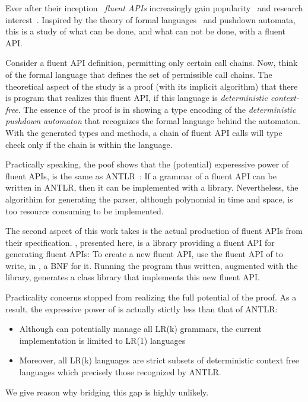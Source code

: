 Ever after their inception~\cite{Fowler:web:2005} \emph{fluent APIs}
  increasingly gain popularity~\cite{Bauer:2005,Freeman:Pryce:06,Larsen:2012} and research
  interest~\cite{Deursen:2000,Kabanov:2008}.
Inspired by the theory of formal languages~\cite{Linz:2001} and pushdown automata,
  this is a study of what can be done, and what can not be done, with a fluent API.

Consider a fluent API definition, permitting only certain call chains.
Now, think of the formal language that defines the set of permissible call chains.
The theoretical aspect of the study is a proof (with its implicit algorithm) that
  there is \Java program that realizes this fluent API, if this
  language is \emph{deterministic context-free}.
The essence of the proof is in showing a \Java type encoding of
  the \emph{deterministic pushdown automaton} that recognizes
  the formal language behind the automaton.
With the generated types and methods, a chain of fluent API calls
  will type check only if the chain is within the language.

Practically speaking, the poof shows that the (potential)
  experessive power of fluent APIs,
  is the same as ANTLR~\cite{Parr:1995:I:Dont:Think:Its:Correct}:
If a grammar of a fluent API can be written in ANTLR, then it
  can be implemented with a \Java library.
Nevertheless, the algorithim for generating the parser, although polynomial
  in time and space, is too resource consuming to be implemented. 

The second aspect of this work takes is the actual production 
  of fluent APIs from their specification.
\Self, presented here, is a \Java library providing a fluent API for generating fluent APIs:
To create a new fluent API, use the fluent API of \Self to write, in \Java, a BNF for it.
Running the \Java program thus written, augmented with the \Self library,
  generates a \Java class library that implements this new fluent API.

Practicality concerns stopped \Self from realizing the full potential of the proof.
As a result, the expressive power of \Self is actually stictly less than that of ANTLR:
\begin{itemize}
  \item Although \Self can potentially manage all LR(k) grammars,
        the current implementation is limited to LR(1) languages
  \item Moreover, all LR(k) languages are strict subsets of deterministic context free languages
      which precisely those recognized by ANTLR.~\cite{Thats not true according to Knuth:65. Any DPDA have a equal LR(k) grammar}
\end{itemize}
We give reason why bridging this gap is highly unlikely.


